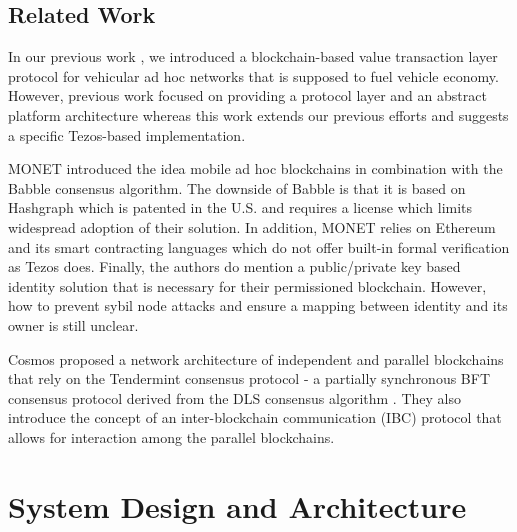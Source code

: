 \documentclass{llncs}
\begin{document}
{		\subsection{Related Work}
			\label{ss:related-work}

			In our previous work \cite{chorusWhitepaper}\cite{chorus2018MCIS}, we introduced a blockchain-based value transaction layer protocol for vehicular ad hoc networks that is supposed to fuel vehicle economy. However, previous work focused on providing a protocol layer and an abstract platform architecture whereas this work extends our previous efforts and suggests a specific Tezos-based implementation.

			MONET \cite{monetWhitepaper} introduced the idea mobile ad hoc blockchains in combination with the Babble consensus algorithm. The downside of Babble is that it is based on Hashgraph \cite{hashgraphWhitepaper} which is patented in the U.S. and requires a license which limits widespread adoption of their solution. In addition, MONET relies on Ethereum and its smart contracting languages which do not offer built-in formal verification as Tezos does. Finally, the authors do mention a public/private key based identity solution that is necessary for their permissioned blockchain. However, how to prevent sybil node attacks and ensure a mapping between identity and its owner is still unclear.

			Cosmos \cite{cosmosWhitepaper} proposed a network architecture of independent and parallel blockchains that rely on the Tendermint consensus protocol - a partially synchronous BFT consensus protocol derived from the DLS consensus algorithm \cite{dwork1988consensus}. They also introduce the concept of an inter-blockchain communication (IBC) protocol that allows for interaction among the parallel blockchains.
			
		


	\section{System Design and Architecture}
		\label{s:section-3}
		
		
}
\end{document}
